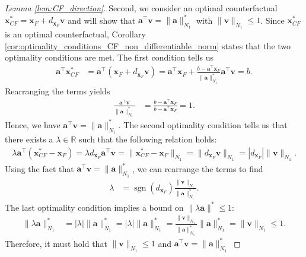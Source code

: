 \documentclass{article}
\DeclareMathOperator*{\sgn}{sgn}
\begin{document}
{\begin{proof}[Lemma \ref{lem:CF_direction}]
    Second, we consider an optimal counterfactual $\bm{x}_{CF}^*= \bm{x}_{F}+d_{\bm{x}_F}\bm{v}$ and will show that $\bm{a}^{\top}\bm{v}=\|\bm{a}\|_{N_1}^*$ with $\|\bm{v}\|_{N_1}\leq 1$. Since $\bm{x}_{CF}^*$ is an optimal counterfactual, Corollary \ref{cor:optimality_conditions_CF_non_differentiable_norm} states that the two optimality conditions are met. The first condition tells us
    \begin{align*}
        \bm{a}^\top \bm{x}_{CF}^* &= \bm{a}^\top (\bm{x}_F+d_{\bm{x}_F}\bm{v})= \bm{a}^\top\bm{x}_F +\frac{b-\bm{a}^{\top}\bm{x}_F}{\|\bm{a}\|_{N_1}^*}\bm{a}^\top\bm{v}=b.
    \end{align*}
    Rearranging the terms yields
    \begin{align*}
        \frac{\bm{a}^\top\bm{v}}{\|\bm{a}\|_{N_1}^*}&=\frac{b-\bm{a}^{\top}\bm{x}_F}{b-\bm{a}^{\top}\bm{x}_F}=1.
    \end{align*}
    Hence, we have $\bm{a}^\top\bm{v}=\|\bm{a}\|_{N_1}^*$. The second optimality condition tells us that there exists a $\lambda\in\mathbb{R}$ such that the following relation holds:
    \begin{align*}
        \lambda \bm{a}^\top (\bm{x}_{CF}^* - \bm{x}_F) =\lambda d_{\bm{x}_F}\bm{a}^\top\bm{v}=\|\bm{x}_{CF}^* - \bm{x}_F\|_{N_1}=\|d_{\bm{x}_F}\bm{v}\|_{N_1}= |d_{\bm{x}_F}|\|\bm{v}\|_{N_1}.
    \end{align*}
    Using the fact that $\bm{a}^\top\bm{v}=\|\bm{a}\|_{N_1}^*$, we can rearrange the terms to find
    \begin{align*}
        \lambda&=\sgn(d_{\bm{x}_F})\frac{\|\bm{v}\|_{N_1}}{\|\bm{a}\|_{N_1}^*}.
    \end{align*}
    The last optimality condition implies a bound on $\|\lambda \bm a\|^*\leq 1$:
    \begin{align*}
        \|\lambda \bm a\|_{N_1}^*& = |\lambda| \|\bm{a}\|_{N_1}^* = |\lambda| \|\bm{a}\|_{N_1}^* = \frac{\|\bm{v}\|_{N_1}}{\|\bm{a}\|_{N_1}^*}\|\bm{a}\|_{N_1}^*=\|\bm{v}\|_{N_1}\leq 1.
    \end{align*}
    Therefore, it must hold that $\|\bm{v}\|_{N_1}\leq 1$ and $\bm{a}^{\top}\bm{v}=\|\bm{a}\|_{N_1}^*$
\end{proof}

}
\end{document}
